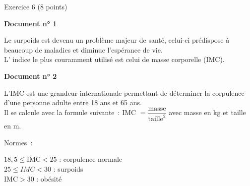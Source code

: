 
%
\begin{h2}Exercice 6 (8 points)\end{h2}
\medbreak
\textbf{Document n° 1}
\par
Le surpoids est devenu un problème majeur de santé, celui-ci prédispose à beaucoup de maladies et diminue l'espérance de vie.\\
L' indice le plus couramment utilisé est celui de masse corporelle (IMC).
\par
\textbf{Document n° 2}
\par
L'IMC est une grandeur internationale permettant de déterminer la corpulence d'une personne adulte entre
18 ans et 65 ans.\\
Il se calcule avec la formule suivante~: IMC $= \dfrac{\text{masse}}{\text{taille}^2}$
avec \og masse \fg{} en kg et \og taille \fg{} en m.
\par
Normes~: \\
\begin{indent}
     $18,5 \leqslant  \text{IMC} < 25$ : corpulence normale\\
     $25 \leqslant IMC < 30$  : surpoids\\
     $\text{IMC} > 30$ : obésité\\
\end{indent}
